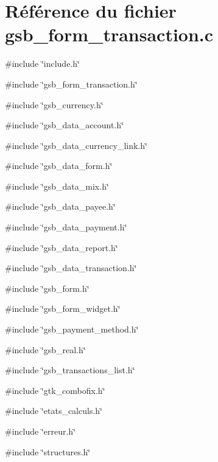 \section{Référence du fichier gsb\_\-form\_\-transaction.c}
\label{gsb__form__transaction_8c}
{\ttfamily \#include \char`\"{}include.h\char`\"{}}\par
{\ttfamily \#include \char`\"{}gsb\_\-form\_\-transaction.h\char`\"{}}\par
{\ttfamily \#include \char`\"{}gsb\_\-currency.h\char`\"{}}\par
{\ttfamily \#include \char`\"{}gsb\_\-data\_\-account.h\char`\"{}}\par
{\ttfamily \#include \char`\"{}gsb\_\-data\_\-currency\_\-link.h\char`\"{}}\par
{\ttfamily \#include \char`\"{}gsb\_\-data\_\-form.h\char`\"{}}\par
{\ttfamily \#include \char`\"{}gsb\_\-data\_\-mix.h\char`\"{}}\par
{\ttfamily \#include \char`\"{}gsb\_\-data\_\-payee.h\char`\"{}}\par
{\ttfamily \#include \char`\"{}gsb\_\-data\_\-payment.h\char`\"{}}\par
{\ttfamily \#include \char`\"{}gsb\_\-data\_\-report.h\char`\"{}}\par
{\ttfamily \#include \char`\"{}gsb\_\-data\_\-transaction.h\char`\"{}}\par
{\ttfamily \#include \char`\"{}gsb\_\-form.h\char`\"{}}\par
{\ttfamily \#include \char`\"{}gsb\_\-form\_\-widget.h\char`\"{}}\par
{\ttfamily \#include \char`\"{}gsb\_\-payment\_\-method.h\char`\"{}}\par
{\ttfamily \#include \char`\"{}gsb\_\-real.h\char`\"{}}\par
{\ttfamily \#include \char`\"{}gsb\_\-transactions\_\-list.h\char`\"{}}\par
{\ttfamily \#include \char`\"{}gtk\_\-combofix.h\char`\"{}}\par
{\ttfamily \#include \char`\"{}etats\_\-calculs.h\char`\"{}}\par
{\ttfamily \#include \char`\"{}erreur.h\char`\"{}}\par
{\ttfamily \#include \char`\"{}structures.h\char`\"{}}\par
